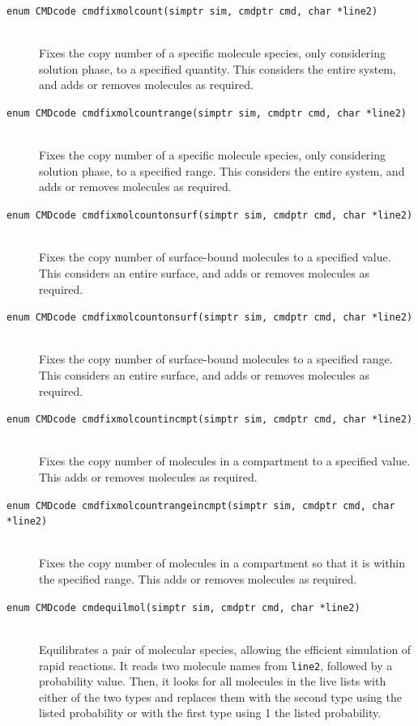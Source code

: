 \documentclass {scrbook}
\newcommand {\ttt} {\texttt}
\begin{document}
\begin{description}
\item[\ttt{enum CMDcode cmdfixmolcount(simptr sim, cmdptr cmd, char *line2)}]
\hfill \\
Fixes the copy number of a specific molecule species, only considering solution phase, to a specified quantity. This considers the entire system, and adds or removes molecules as required.

\item[\ttt{enum CMDcode cmdfixmolcountrange(simptr sim, cmdptr cmd, char *line2)}]
\hfill \\
Fixes the copy number of a specific molecule species, only considering solution phase, to a specified range. This considers the entire system, and adds or removes molecules as required.

\item[\ttt{enum CMDcode cmdfixmolcountonsurf(simptr sim, cmdptr cmd, char *line2)}]
\hfill \\
Fixes the copy number of surface-bound molecules to a specified value. This considers an entire surface, and adds or removes molecules as required.

\item[\ttt{enum CMDcode cmdfixmolcountonsurf(simptr sim, cmdptr cmd, char *line2)}]
\hfill \\
Fixes the copy number of surface-bound molecules to a specified range. This considers an entire surface, and adds or removes molecules as required.

\item[\ttt{enum CMDcode cmdfixmolcountincmpt(simptr sim, cmdptr cmd, char *line2)}]
\hfill \\
Fixes the copy number of molecules in a compartment to a specified value. This adds or removes molecules as required.

\item[\ttt{enum CMDcode cmdfixmolcountrangeincmpt(simptr sim, cmdptr cmd, char *line2)}]
\hfill \\
Fixes the copy number of molecules in a compartment so that it is within the specified range. This adds or removes molecules as required.

\item[\ttt{enum CMDcode cmdequilmol(simptr sim, cmdptr cmd, char *line2)}]
\hfill \\
Equilibrates a pair of molecular species, allowing the efficient simulation of rapid reactions. It reads two molecule names from \ttt{line2}, followed by a probability value. Then, it looks for all molecules in the live lists with either of the two types and replaces them with the second type using the listed probability or with the first type using 1 the listed probability.


\end{description}
\end{document}
